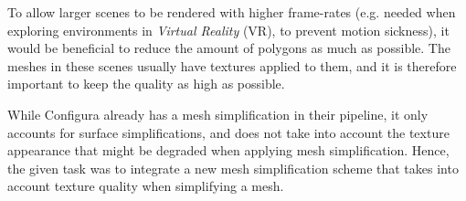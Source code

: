 To allow larger scenes to be rendered with higher frame-rates (e.g. needed when exploring environments in \emph{Virtual Reality} (VR), to prevent motion sickness), it would be beneficial to reduce the amount of polygons as much as possible. The meshes in these scenes usually have textures applied to them, and it is therefore important to keep the quality as high as possible.

While Configura already has a mesh simplification in their pipeline, it only accounts for surface simplifications, and does not take into account the texture appearance that might be degraded when applying mesh simplification. Hence, the given task was to integrate a new mesh simplification scheme that takes into account texture quality when simplifying a mesh.




